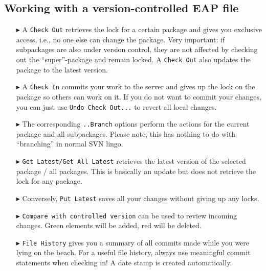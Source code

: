 \subsection{Working with a version-controlled EAP file}

\begin{enumerate}
  \item[$\blacktriangleright$] A \texttt{Check Out} retrieves the lock for a certain package and gives you exclusive access, i.e., no one else can change the
  package. Very important: if subpackages are also under version control, they are not affected by checking out the ``super''-package and remain locked.
  A \texttt{Check Out} also updates the package to the latest version.

\item[$\blacktriangleright$] A \texttt{Check In} commits your work to the server and gives up the lock on the package so others can work on it.
If you do not want to commit your changes, you can just use \texttt{Undo Check Out...} to revert all local changes.

\item[$\blacktriangleright$]  The corresponding \texttt{..Branch} options perform the actions for the current package and all subpackages.
Please note, this has nothing to do with ``branching'' in normal SVN lingo.

\item[$\blacktriangleright$] \texttt{Get Latest/Get All Latest} retrieves the latest version of the selected package / all packages.
This is basically an update but does not retrieve the lock for any package.

\item[$\blacktriangleright$] Conversely, \texttt{Put Latest} saves all your changes without giving up any locks.

\item[$\blacktriangleright$] \texttt{Compare with controlled version} can be used to review incoming changes.
Green elements will be added, red will be deleted.

\item[$\blacktriangleright$] \texttt{File History} gives you a summary of all commits made while you were lying on the beach.
For a useful file history, always use meaningful commit statements when checking in!
A date stamp is created automatically.
\end{enumerate}
